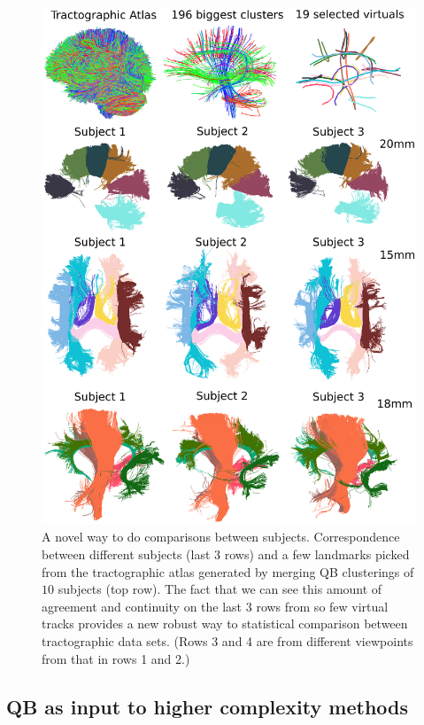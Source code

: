 \documentclass{bioinfo}
\begin{document}
%
\begin{figure}
\begin{centering}
\includegraphics[scale=0.5]{Figures/Fig_7_close_distance}
\par\end{centering}
\caption{A novel way to do comparisons between subjects. Correspondence
  between different subjects (last $3$ rows) and a few landmarks picked
  from the tractographic atlas generated by merging QB clusterings of
  $10$ subjects (top row). The fact that we can see this amount of
  agreement and continuity on the last $3$ rows from so few virtual
  tracks provides a new robust way to statistical comparison between
  tractographic data sets. (Rows 3 and 4 are from different viewpoints
  from that in rows 1 and 2.) \label{Flo:CloseToSelected}}
\end{figure}

\subsection{QB as input to higher complexity methods\label{sub:QB_as_input}}
\end{document}
